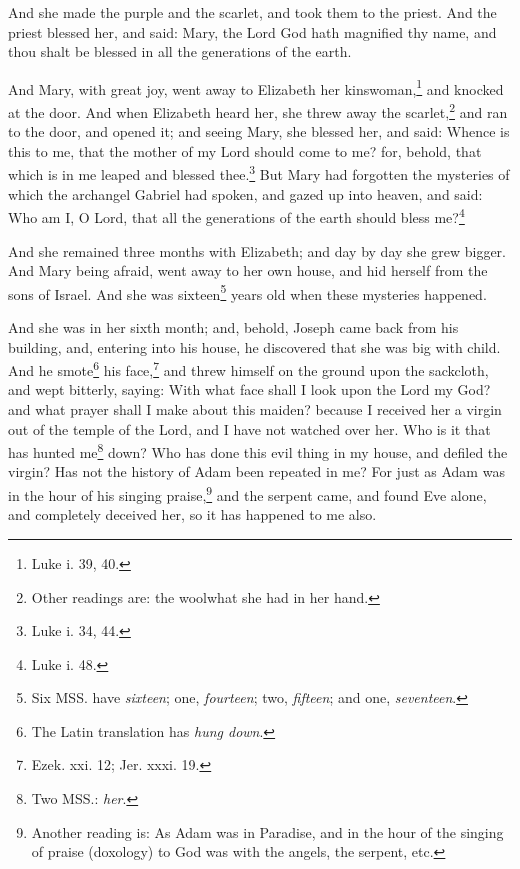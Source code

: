 \pend\pstart
{}

\pend\pstart
And she made the purple and the scarlet, and took them to the priest. And the priest blessed her, and said: Mary, the Lord God hath magnified thy name, and thou shalt be blessed in all the generations of the earth.

\pend\pstart
And Mary, with great
joy, went away to Elizabeth her kinswoman,\footnote{Luke i. 39, 40.} and knocked at the door. And when Elizabeth heard her, she threw away the scarlet,\footnote{Other readings are: the wool\textemdash what she had in her hand.} and ran to the door, and opened it; and seeing Mary, she blessed her, and said: Whence is this to me, that the mother of my Lord should come to me? for, behold, that which is in me leaped and blessed thee.\footnote{Luke i. 34, 44.} But Mary had forgotten the mysteries of which the archangel Gabriel had spoken, and gazed up into heaven, and said: Who am I, O Lord, that all the generations of the earth should bless me?\footnote{Luke i. 48.}

\pend\pstart
And she remained three months with Elizabeth; and day by day she grew bigger. And Mary being afraid, went away to her own house, and hid herself from the sons of Israel. And she was sixteen\footnote{Six MSS. have \textit{sixteen}; one, \textit{fourteen}; two, \textit{fifteen}; and one, \textit{seventeen}.} years old when these mysteries happened.

\pend\pstart
{}

\pend\pstart
And she was in her sixth month; and, behold, Joseph came back from his building, and, entering into his house, he discovered that she was big with child. And he smote\footnote{The Latin translation has \textit{hung down}.} his face,\footnote{Ezek. xxi. 12; Jer. xxxi. 19.} and threw himself on the ground upon the sackcloth, and wept bitterly, saying: With what face shall I look upon the Lord my God? and what prayer shall I make about this maiden? because I received her a virgin out of the temple of the Lord, and I have not watched over her. Who is it that has hunted me\footnote{Two MSS.: \textit{her}.} down? Who has done this evil thing in my house, and defiled the virgin? Has not the history of Adam been repeated in me? For just as Adam was in the hour of his singing praise,\footnote{Another reading is: As Adam was in Paradise, and in the hour of the singing of praise (doxology) to God was with the angels, the serpent, etc.} and the serpent came, and found Eve alone, and completely deceived her, so it has happened to me also.

